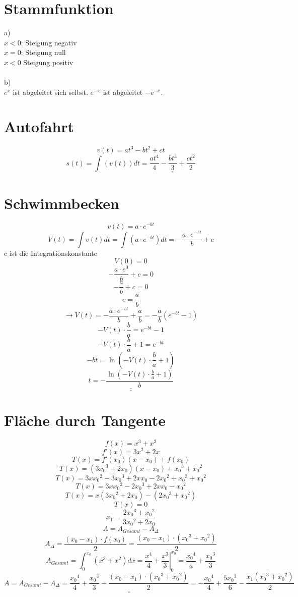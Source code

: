 \section{Stammfunktion}
a)\\
$x<0$: Steigung negativ\\
$x=0$: Steigung null\\
$x<0$ Steigung positiv\\\\
b)\\
$e^x$ ist abgeleitet sich selbst. $e^{-x}$ ist abgeleitet $-e^{-x}$. 

\section{Autofahrt}
\[ v(t) = a t^3 - b t^2 + c t \]
\[ s(t) = \int (v(t)) dt = \underline{\underline{\frac{a t^4}{4} - \frac{b t^3}{3} + \frac{c t^2}{2}}} \]

\section{Schwimmbecken}
\[ v(t) = a \cdot e^{-bt} \]
\[ V(t) = \int v(t) dt = \int \left(a \cdot e^{-bt}\right) dt = -\frac{a \cdot e^{-bt}}{b} + c \]
c ist die Integrationskonstante
\[ V(0) = 0 \]
\[ -\frac{a \cdot e^{0}}{b} + c = 0 \]
\[ -\frac{a}{b} + c = 0 \]
\[ c = \frac{a}{b} \]
\[ \rightarrow V(t) = -\frac{a \cdot e^{-bt}}{b} + \frac{a}{b} = -\frac{a}{b} \left( e^{-bt} - 1 \right) \]
\[ -V(t) \cdot \frac{b}{a} = e^{-bt} - 1 \]
\[ -V(t) \cdot \frac{b}{a} + 1 = e^{-bt} \]
\[ -bt = \ln\left(-V(t) \cdot \frac{b}{a} + 1\right) \]
\[ \underline{\underline{t = -\frac{\ln\left(-V(t) \cdot \frac{b}{a} + 1\right)}{b}}} \]
\[  \]
\[  \]
\[  \]
\[  \]
\[  \]
\[  \]

\section{Fläche durch Tangente}
\[ f(x) = x^3 + x^2 \]
\[ f'(x) = 3 x^2 + 2 x \]
\[ T(x) = f'(x_0)(x - x_0) + f(x_0) \]
\[ T(x) = (3 {x_0}^3 + 2 x_0)(x-x_0) + {x_0}^3 + {x_0}^2 \]
\[ T(x) = 3 x {x_0}^2 - 3 {x_0}^3 + 2 x x_0 - 2 {x_0}^2 + {x_0}^3 + {x_0}^2 \]
\[ T(x) = 3 x {x_0}^2 - 2 {x_0}^3 + 2 x x_0 - {x_0}^2 \]
\[ T(x) = x(3 {x_0}^2 + 2 x_0) - (2 {x_0}^3 + {x_0}^2) \]
\[ T(x) = 0 \]
\[ x_1 = \frac{2 {x_0}^3 + {x_0}^2}{3 {x_0}^2 + 2 x_0} \]
\[ A = A_{Gesamt} - A_\Delta \]
\[ A_\Delta = \frac{(x_0 - x_1) \cdot f(x_0)}{2} = \frac{(x_0 - x_1) \cdot ({x_0}^3 + {x_0}^2)}{2} \]
\[ A_{Gesamt} = \int_0^{x_0} (x^3 + x^2) dx = \left.\frac{x^4}{4} + \frac{x^3}{3} \right|_{0}^{x_0} = \frac{{x_0}^4}{a} + \frac{{x_0}^3}{3} \]
\[ A = A_{Gesamt} - A_\Delta = \underline{\underline{\frac{{x_0}^4}{4} + \frac{{x_0}^3}{3} - \frac{(x_0 - x_1) \cdot ({x_0}^3 + {x_0}^2)}{2}}} = -\frac{{x_0}^4}{4} + \frac{5 {x_0}^3}{6} - \frac{x_1 ({x_0}^3 + {x_0}^2)}{2} \]

